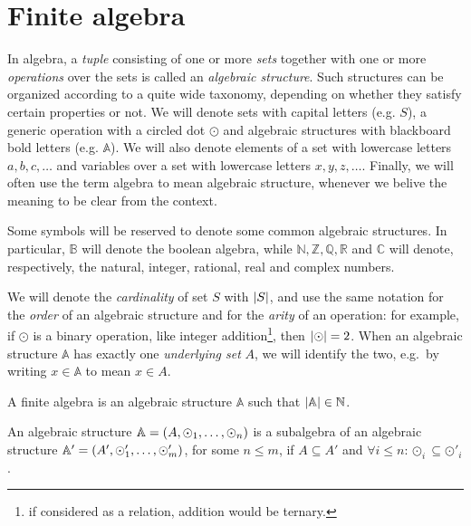 \section{Finite algebra}\label{sec:prime_fields}
In algebra, a \emph{tuple} consisting of one or more \emph{sets} together with one or more 
\emph{operations} over the sets is called an \emph{algebraic structure}.
Such structures can be organized according to a quite wide taxonomy, depending on whether 
they satisfy certain properties or not. 
We will denote sets with capital letters (e.g. \(S\)), a generic operation with a circled dot 
\(\odot \) and algebraic structures with blackboard bold letters (e.g. \(\mathbb{A}\)).
We will also denote elements of a set with lowercase letters \(a, b, c, \dots \) and variables 
over a set with lowercase letters \(x, y, z, \dots \).
Finally, we will often use the term algebra to mean algebraic structure, whenever we belive the 
meaning to be clear from the context.
\begin{remark}
  Some symbols will be reserved to denote some common algebraic structures. 
  In particular, \(\mathbb{B}\) will denote the boolean algebra, while \(\mathbb{N}, \mathbb{Z}, 
  \mathbb{Q}, \mathbb{R}\) and \(\mathbb{C}\) will denote, respectively, the 
  natural, integer, rational, real and complex numbers.
\end{remark}

We will denote the \emph{cardinality} of set \(S\) with \(\left\lvert S\right\rvert\), and use the same notation for the \emph{order} of an algebraic structure and for the \emph{arity} of an operation: for example, if \(\odot \) is a binary operation, like integer 
addition\footnote{if considered as a relation, addition would be ternary.}, then 
\(\left\lvert\odot\right\rvert = 2\).
When an algebraic structure \(\mathbb{A}\) has exactly one \emph{underlying set} \(A\), we will identify the two, e.g.\ by writing \(x \in \mathbb{A}\) to mean \(x \in A\).

\begin{definition}
  A finite algebra is an algebraic structure \(\mathbb{A}\) such that \(\left\lvert\mathbb{A}\right\rvert \in \mathbb{N}\).
\end{definition}
\begin{definition}[Subalgebra]
  An algebraic structure \(\mathbb{A} = \left(A, \odot_1, \dots, \odot_n\right)\) is a subalgebra of an algebraic structure \(\mathbb{A}' = \left(A', \odot'_1, \dots, \odot'_m\right)\), for some \(n \le m\), if \(A \subseteq A'\) and \(\forall i \le n\colon \odot_i \subseteq \odot'_i\).
\end{definition}

